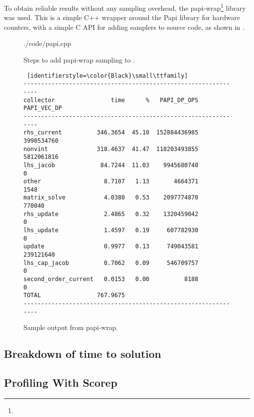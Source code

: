 To obtain reliable results without any sampling overhead, the papi-wrap\footnote{} library was used. This is a simple C++ wrapper around the Papi library for hardware counters, with a simple C API for adding samplers to source code, as shown in .

\begin{figure}[htp!]
\begin{shaded}
 {./code/papi.cpp}
\end{shaded}
\caption{Steps to add papi-wrap sampling to \neuron.}
\label{fig:papiinline}
\end{figure}

\begin{figure}[htp!]
\begin{lstlisting} [identifierstyle=\color{Black}\small\ttfamily]
---------------------------------------------------------------
collector                time      %   PAPI_DP_OPS PAPI_VEC_DP
---------------------------------------------------------------
rhs_current          346.3654  45.10  152884436985  3990534760
nonvint              318.4637  41.47  118203493855  5812061816
lhs_jacob             84.7244  11.03    9945680740           0
other                  8.7107   1.13       4664371        1548
matrix_solve           4.0380   0.53    2097774870      770040
rhs_update             2.4865   0.32    1320459042           0
lhs_update             1.4597   0.19     607782930           0
update                 0.9977   0.13     749043581   239121640
lhs_cap_jacob          0.7062   0.09     546709757           0
second_order_current   0.0153   0.00          8188           0
TOTAL                767.9675
---------------------------------------------------------------
\end{lstlisting}
\caption{Sample output from papi-wrap.}
\label{fig:papisample}
\end{figure}

\subsection{Breakdown of time to solution}

\subsection{Profiling With Scorep}
\label{sec:scorep}

